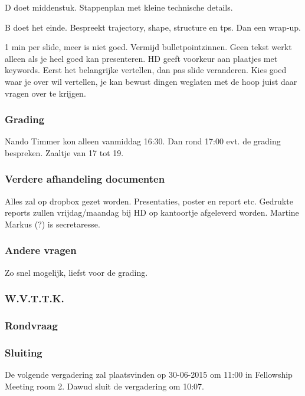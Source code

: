 D doet middenstuk. Stappenplan met kleine technische details.

B doet het einde. Bespreekt trajectory, shape, structure en tps. Dan een wrap-up.

1 min per slide, meer is niet goed. Vermijd bulletpointzinnen. Geen tekst werkt alleen als je heel goed kan presenteren. HD geeft voorkeur aan plaatjes met keywords. Eerst het belangrijke vertellen, dan pas slide veranderen. Kies goed waar je over wil vertellen, je kan bewust dingen weglaten met de hoop juist daar vragen over te krijgen.



\subsubsection{Grading}
Nando Timmer kon alleen vanmiddag 16:30. Dan rond 17:00 evt. de grading bespreken. Zaaltje van 17 tot 19. 

\subsubsection{Verdere afhandeling documenten}
Alles zal op dropbox gezet worden. Presentaties, poster en report etc.
Gedrukte reports zullen vrijdag/maandag bij HD op kantoortje afgeleverd worden. Martine Markus (?) is secretaresse. 

\subsubsection{Andere vragen}
 Zo snel mogelijk, liefst voor de grading.

\subsubsection{W.V.T.T.K.}


\subsubsection{Rondvraag}


\subsubsection{Sluiting}
De volgende vergadering zal plaatsvinden op 30-06-2015 om 11:00 in Fellowship Meeting room 2.
\newline\newline
Dawud sluit de vergadering om 10:07.
